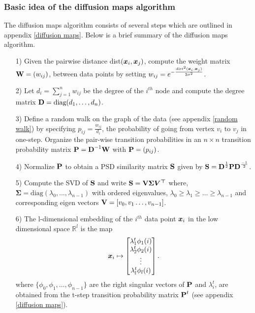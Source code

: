 \subsubsection{Basic idea of the diffusion maps algorithm}
The diffusion maps algorithm consists of several steps which are outlined in appendix \ref{diffusion maps}. Below is a brief summary of the diffusion maps algorithm.

\begin{itemize}
\item[1)] Given the pairwise distance dist$(\boldsymbol{x}_i, \boldsymbol{x}_j)$, compute the weight matrix 
$\textbf{W} = (w_{ij})$, between data points by setting
$w_{ij} = \displaystyle e^{- \frac{\text{dist}^{2}(\boldsymbol{x}_i, \boldsymbol{x}_j)}{2 \sigma^2}}$.
\item[2)] Let $d_{i} = \sum_{j = 1}^{n} w_{ij}$ be the degree of the $i^{th}$ node and compute the degree matrix $\textbf{D} = \text{diag}(d_{1}, \ldots, d_{n})$.
\item[3)] Define a random walk on the graph of the data (see appendix \ref{random walk}) by specifying $p_{ij} = \displaystyle \frac{w_{ij}}{d_{i}}$, the probability of going from vertex $v_i$ to $v_j$ in one-step. Organize the pair-wise transition probabilities in an $n \times n$ 
transition probability matrix $\textbf{P} = \textbf{D}^{-1}\textbf{W}$ with $\textbf{P} = (p_{ij})$.
\item[4)] Normalize $\textbf{P}$ to obtain a PSD similarity matrix $\textbf{S}$ given by
$\textbf{S} = \textbf{D}^{\frac{1}{2}}\textbf{P}\textbf{D}^{\frac{-1}{2}}$.
\item[5)] Compute the SVD of $\textbf{S}$ and write $\textbf{S} = \textbf{V}\bm{\Sigma}\bm{V^{\top}}$ where,
$\bm{\Sigma} = \text{diag}(\lambda_{0}, \ldots, \lambda_{n-1})$ with ordered eigenvalues, 
$\lambda_{0}\geq \lambda_{1} \geq \ldots \geq \lambda_{n-1}$ and corresponding eigen vectors 
$\textbf{V} = [v_0, v_1 \ldots, v_{n-1}]$.
\item[6)] The l-dimensional embedding of the $i^{th}$ data point $\boldsymbol{x}_i$
in the low dimensional space $\mathbb{R}^{l}$ is the map
$$ \boldsymbol{x}_{i} \mapsto  \begin{bmatrix}
         \lambda_{1}^{t}\phi_{1}(i)\\
         \lambda_{2}^{t}\phi_{2}(i)\\
         \vdots\\
         \lambda_{l}^{t}\phi_{l}(i)
        \end{bmatrix} .$$
where $\{ \phi_{0}, \phi_{1}, \ldots, \phi_{n-1} \}$ are the right singular vectors of $\textbf{P}$
and $\lambda_{i}^{t}$, are obtained from the t-step transition probability matrix $\textbf{P}^{t}$
(see appendix \ref{diffusion maps}).
\end{itemize}
